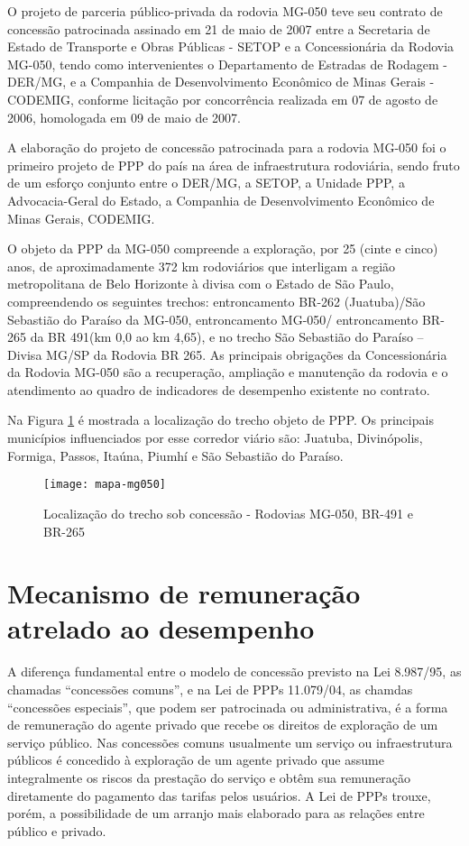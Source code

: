 \documentclass[
	12pt,				%
	openright,			%
	twoside,			%
	a4paper,			%
	english,			%
	french,				%
	spanish,			%
	brazil				%
	]{abntex2}
\begin{document}
O projeto de parceria público-privada da rodovia MG-050 teve seu contrato de concessão patrocinada assinado em 21 de maio de 2007 entre a Secretaria de Estado de Transporte e Obras Públicas - SETOP e a Concessionária da Rodovia MG-050, tendo como intervenientes o Departamento de Estradas de Rodagem - DER/MG, e a Companhia de Desenvolvimento Econômico de Minas Gerais - CODEMIG, conforme licitação por concorrência realizada em 07 de agosto de 2006, homologada em 09 de maio de 2007.

A elaboração do projeto de concessão patrocinada para  a rodovia MG-050 foi o primeiro projeto de PPP do país na área de infraestrutura rodoviária, sendo fruto de um esforço conjunto entre o DER/MG, a SETOP, a Unidade PPP, a Advocacia-Geral do Estado, a Companhia de Desenvolvimento Econômico de Minas Gerais, CODEMIG.

O objeto da PPP da MG-050 compreende a exploração, por 25 (cinte e cinco) anos, de aproximadamente 372 km rodoviários que interligam a região metropolitana de Belo Horizonte à divisa com o Estado de São Paulo, compreendendo os seguintes trechos: entroncamento BR-262 (Juatuba)/São Sebastião do Paraíso da MG-050, entroncamento MG-050/ entroncamento BR-265 da BR 491(km 0,0 ao km 4,65), e no trecho São Sebastião do Paraíso – Divisa MG/SP da Rodovia BR 265. As principais obrigações da Concessionária da Rodovia MG-050 são a recuperação, ampliação e manutenção da rodovia e o atendimento ao quadro de indicadores de desempenho existente no contrato.

Na Figura \ref{fig:mapa-mg050} é mostrada a localização do trecho objeto de PPP. Os principais municípios influenciados por esse corredor viário são: Juatuba, Divinópolis, Formiga, Passos, Itaúna, Piumhí e São Sebastião do Paraíso.
 

\begin{figure}[h]
\caption{\label{fig:mapa-mg050}Localização do trecho sob concessão - Rodovias MG-050, BR-491 e BR-265}
\centering
\texttt{[image: mapa-mg050]}
\end{figure}

\section{Mecanismo de remuneração atrelado ao desempenho}

A diferença fundamental entre o modelo de concessão previsto na Lei 8.987/95, as chamadas “concessões comuns”, e na Lei de PPPs 11.079/04, as chamdas “concessões especiais”, que podem ser patrocinada ou administrativa, é a forma de remuneração do agente privado que recebe os direitos de exploração de um serviço público. Nas concessões comuns usualmente um serviço ou infraestrutura públicos é concedido à exploração de um agente privado que assume integralmente os riscos da prestação do serviço e obtêm sua remuneração diretamente do pagamento das tarifas pelos usuários. A Lei de PPPs trouxe, porém, a possibilidade de um arranjo mais elaborado para as relações entre público e privado.
\end{document}
